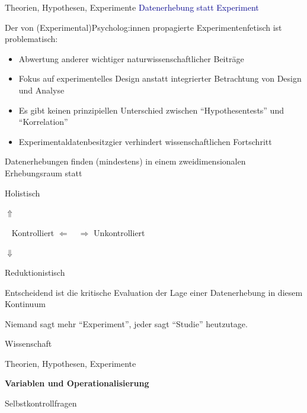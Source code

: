 \documentclass[
  8pt,
  ignorenonframetext,
]{beamer}
\providecommand{\tightlist}{%
  \setlength{\itemsep}{0pt}\setlength{\parskip}{0pt}}
\begin{document}
\begin{frame}{Theorien, Hypothesen, Experimente}
\protect\hypertarget{theorien-hypothesen-experimente-8}{}
\textcolor{darkblue}{Datenerhebung statt Experiment} \small
{}

Der von (Experimental)Psycholog:innen propagierte Experimentenfetisch
ist problematisch:

\begin{itemize}
\tightlist
\item
  Abwertung anderer wichtiger naturwissenschaftlicher Beiträge
\item
  Fokus auf experimentelles Design anstatt integrierter Betrachtung von
  Design und Analyse
\item
  Es gibt keinen prinzipiellen Unterschied zwischen ``Hypothesentests''
  und ``Korrelation''
\item
  Experimentaldatenbesitzgier verhindert wissenschaftlichen Fortschritt
\end{itemize}

\vspace{1mm}

Datenerhebungen finden (mindestens) in einem zweidimensionalen
Erhebungsraum statt

\center

Holistisch

\(\Uparrow\)

\(\,\,\,\) Kontrolliert \(\Leftarrow \quad \Rightarrow\) Unkontrolliert

\(\Downarrow\)

Reduktionistisch

Entscheidend ist die kritische Evaluation der Lage einer Datenerhebung
in diesem Kontinuum

\center

Niemand sagt mehr ``Experiment'', jeder sagt ``Studie'' heutzutage.
\end{frame}

\begin{frame}{}
\protect\hypertarget{section-5}{}
\vfill
{}
\Large

Wissenschaft

Theorien, Hypothesen, Experimente

\textbf{Variablen und Operationalisierung}

Selbstkontrollfragen
\end{frame}
\end{document}
